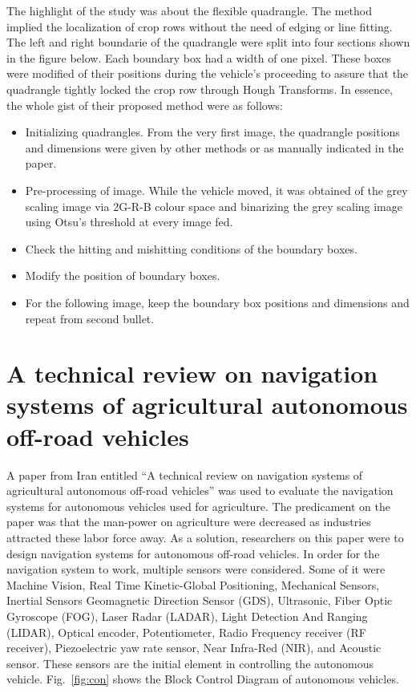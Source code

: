     The highlight of the study was about the flexible quadrangle. The method implied the localization of crop rows without the need of edging or line fitting. The left and right boundarie of the quadrangle were split into four sections shown in the figure below. Each boundary box had a width of one pixel. These boxes were modified of their positions during the vehicle’s proceeding to assure that the quadrangle tightly locked the crop row through Hough Transforms. In essence, the whole gist of their proposed method were as follows:
    \begin{itemize}
\item Initializing quadrangles. From the very first image, the quadrangle positions and dimensions were given by other methods or as manually indicated in the paper.
\item Pre-processing of image. While the vehicle moved, it was obtained of the grey scaling image via 2G-R-B colour space and binarizing the grey scaling image using Otsu’s threshold at every image fed.
\item Check the hitting and mishitting conditions of the boundary boxes.
\item Modify the position of boundary boxes.
\item For the following image, keep the boundary box positions and dimensions and repeat from second bullet.
\end{itemize}

\section{A technical review on navigation systems of agricultural autonomous off-road vehicles}

A paper from Iran entitled “A technical review on navigation systems of agricultural autonomous off-road vehicles” was used to evaluate the navigation systems for autonomous vehicles used for agriculture. The predicament on the paper was that the man-power on agriculture were decreased as industries attracted these labor force away. As a solution, researchers on this paper were to design navigation systems for autonomous off-road vehicles. In order for the navigation system to work, multiple sensors were considered. Some of it were Machine Vision, Real Time Kinetic-Global Positioning, Mechanical Sensors, Inertial Sensors Geomagnetic Direction Sensor (GDS), Ultrasonic, Fiber Optic Gyroscope (FOG), Laser Radar (LADAR), Light Detection And Ranging (LIDAR), Optical encoder, Potentiometer, Radio Frequency receiver (RF receiver), Piezoelectric yaw rate sensor, Near Infra-Red (NIR), and Acoustic sensor. These sensors are the initial element in controlling the autonomous vehicle. Fig.~\ref{fig:con} shows the Block Control Diagram of autonomous vehicles.

